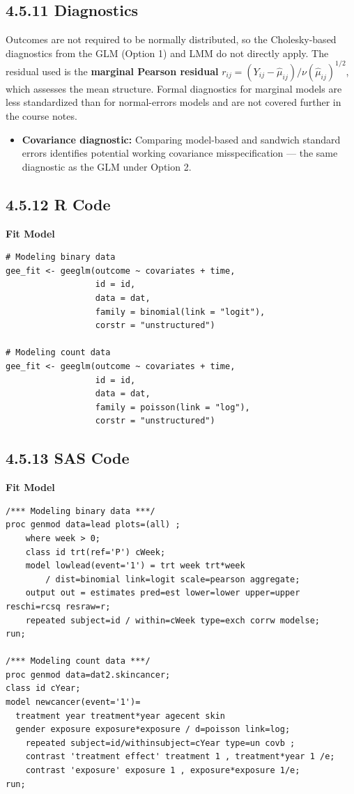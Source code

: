 \documentclass[11pt]{article}
\begin{document}
\subsection*{4.5.11 Diagnostics}

Outcomes are not required to be normally distributed, so the Cholesky-based diagnostics from the GLM (Option 1) and LMM do not directly apply. The residual used is the \textbf{marginal Pearson residual} $r_{ij} = (Y_{ij} - \hat{\mu}_{ij})/\nu(\hat{\mu}_{ij})^{1/2}$, which assesses the mean structure. Formal diagnostics for marginal models are less standardized than for normal-errors models and are not covered further in the course notes.

\begin{itemize}[leftmargin=2em]
  \item \textbf{Covariance diagnostic:} Comparing model-based and sandwich standard errors identifies potential working covariance misspecification --- the same diagnostic as the GLM under Option 2.
\end{itemize}

\subsection{4.5.12 R Code}

\textbf{Fit Model}
\begin{lstlisting}[style=Rstyle]
# Modeling binary data
gee_fit <- geeglm(outcome ~ covariates + time,
                  id = id,
                  data = dat,
                  family = binomial(link = "logit"),
                  corstr = "unstructured")

# Modeling count data
gee_fit <- geeglm(outcome ~ covariates + time,
                  id = id,
                  data = dat,
                  family = poisson(link = "log"),
                  corstr = "unstructured")
\end{lstlisting}

\subsection{4.5.13 SAS Code}

\textbf{Fit Model}
\begin{lstlisting}[style=SASstyle]
/*** Modeling binary data ***/
proc genmod data=lead plots=(all) ;
	where week > 0;
	class id trt(ref='P') cWeek;
	model lowlead(event='1') = trt week trt*week 
		/ dist=binomial link=logit scale=pearson aggregate;
	output out = estimates pred=est lower=lower upper=upper reschi=rcsq resraw=r;
	repeated subject=id / within=cWeek type=exch corrw modelse;
run;

/*** Modeling count data ***/
proc genmod data=dat2.skincancer;
class id cYear;
model newcancer(event='1')=
  treatment year treatment*year agecent skin 
  gender exposure exposure*exposure / d=poisson link=log;
	repeated subject=id/withinsubject=cYear type=un covb ;
	contrast 'treatment effect' treatment 1 , treatment*year 1 /e;
	contrast 'exposure' exposure 1 , exposure*exposure 1/e;
run;
\end{lstlisting}
\end{document}
